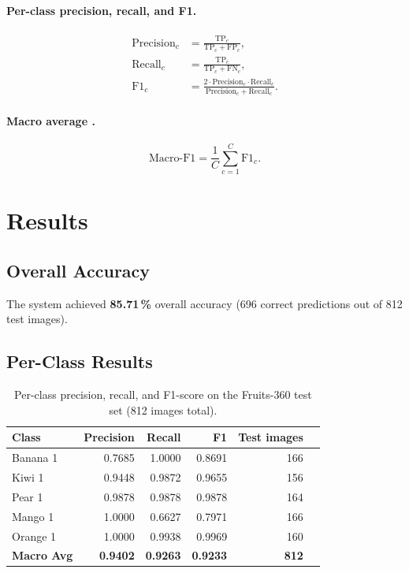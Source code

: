 \documentclass[11pt,a4paper]{article}
\begin{document}
\paragraph{Per-class precision, recall, and F1.}
\begin{align}
  \text{Precision}_c &= \frac{\mathrm{TP}_c}{\mathrm{TP}_c + \mathrm{FP}_c}, \\[4pt]
  \text{Recall}_c    &= \frac{\mathrm{TP}_c}{\mathrm{TP}_c + \mathrm{FN}_c}, \\[4pt]
  \text{F1}_c        &= \frac{2 \cdot \text{Precision}_c \cdot \text{Recall}_c}
                             {\text{Precision}_c + \text{Recall}_c}.
\end{align}

\paragraph{Macro average \citep{sokolova2009systematic}.}
\[
  \text{Macro-F1} = \frac{1}{C} \sum_{c=1}^{C} \text{F1}_c.
\]

\section{Results}

\subsection{Overall Accuracy}

The system achieved \textbf{85.71\,\%} overall accuracy (696 correct
predictions out of 812 test images).

\subsection{Per-Class Results}

\begin{table}[H]
  \centering
  \caption{Per-class precision, recall, and F1-score on the Fruits-360
           test set (812 images total).}
  \label{tab:results}
  \begin{tabular}{@{}lrrrrr@{}}
    \toprule
    \textbf{Class} & \textbf{Precision} & \textbf{Recall} &
    \textbf{F1} & \textbf{Test images} \\
    \midrule
    Banana 1  & 0.7685 & 1.0000 & 0.8691 & 166 \\
    Kiwi 1    & 0.9448 & 0.9872 & 0.9655 & 156 \\
    Pear 1    & 0.9878 & 0.9878 & 0.9878 & 164 \\
    Mango 1   & 1.0000 & 0.6627 & 0.7971 & 166 \\
    Orange 1  & 1.0000 & 0.9938 & 0.9969 & 160 \\
    \midrule
    \textbf{Macro Avg} & \textbf{0.9402} & \textbf{0.9263} &
    \textbf{0.9233} & \textbf{812} \\
    \bottomrule
  \end{tabular}
\end{table}
\end{document}
